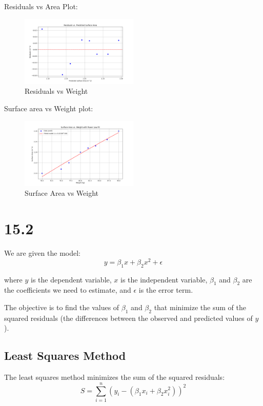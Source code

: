 \documentclass[12pt]{article}
\begin{document}
Residuals vs Area Plot:

\begin{figure}[h]
    \centering
    \includegraphics[width=0.5\textwidth]{../residuals_vs_predicted_area.png}
    \caption{Residuals vs Weight}
\end{figure}
Surface area vs Weight plot: 

\begin{figure}[h]
    \centering
    \includegraphics[width=0.5\textwidth]{../surface_area_vs_weight.png}
    \caption{Surface Area vs Weight}
\end{figure}

\section*{15.2}

We are given the model:
\[
y = \beta_1 x + \beta_2 x^2 + \epsilon
\]

where \( y \) is the dependent variable, \( x \) is the independent variable, \(\beta_1\) and \(\beta_2\) are the coefficients we need to estimate, and \(\epsilon\) is the error term.

The objective is to find the values of \(\beta_1\) and \(\beta_2\) that minimize the sum of the squared residuals (the differences between the observed and predicted values of \( y \)).

\subsection*{Least Squares Method}

The least squares method minimizes the sum of the squared residuals:
\[
S = \sum_{i=1}^n \left( y_i - (\beta_1 x_i + \beta_2 x_i^2) \right)^2
\]
\end{document}

